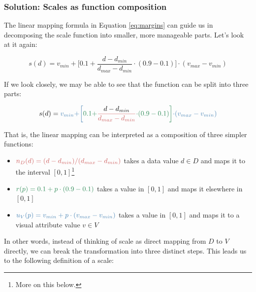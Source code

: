 \documentclass[
  openany]{book}
\providecommand{\tightlist}{%
  \setlength{\itemsep}{0pt}\setlength{\parskip}{0pt}}
\theoremstyle{definition}
\theoremstyle{definition}
\theoremstyle{definition}
\theoremstyle{definition}
\theoremstyle{remark}
\begin{document}
\subsubsection{Solution: Scales as function composition}\label{scales-composition}

The linear mapping formula in Equation \eqref{eq:margins} can guide us in decomposing the scale function into smaller, more manageable parts. Let's look at it again:

\[  s(d) = v_{min} + \bigg[ 0.1 + \frac{d - d_{min}}{d_{max} - d_{min}} \cdot (0.9 - 0.1) 
            \bigg] \cdot (v_{max} - v_{min}) \]

If we look closely, we may be able to see that the function can be split into three parts:


\begin{equation}
s(d) = \color{steelblue}{v_{min} +} \bigg[ \color{seagreen}{0.1 +} \color{indianred}{\frac{\color{black}{d} - d_{min}}{d_{max} - d_{min}}} \color{seagreen}{\cdot (0.9 - 0.1)} \bigg] \color{steelblue}{\cdot (v_{max} - v_{min})}
\label{eq:scale-composition}
\end{equation}

That is, the linear mapping can be interpreted as a composition of three simpler functions:

\begin{itemize}
\tightlist
\item
  \(\color{indianred}{n_D(d) = (d - d_{min}) / (d_{max} - d_{min})}\) takes a data value \(d \in D\) and maps it to the interval \([0, 1]\)\footnote{More on this below.}
\item
  \(\color{seagreen}{r(p) = 0.1 + p \cdot (0.9 - 0.1)}\) takes a value in \([0, 1]\) and maps it elsewhere in \([0, 1]\)
\item
  \(\color{steelblue}{u_V(p) = v_{min} + p \cdot (v_{max} - v_{min})}\) takes a value in \([0, 1]\) and maps it to a visual attribute value \(v \in V\)
\end{itemize}

In other words, instead of thinking of scale as direct mapping from \(D\) to \(V\) directly, we can break the transformation into three distinct steps. This leads us to the following definition of a scale:
\end{document}
